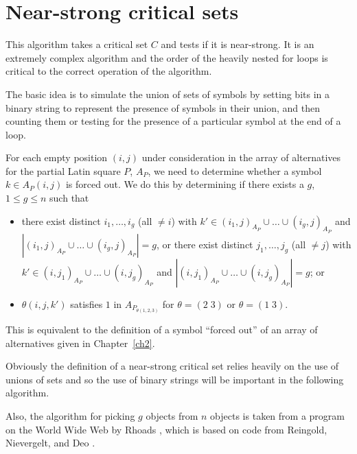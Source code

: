 \documentclass[12pt]{report}
\begin{document}
\section{Near-strong critical sets}
This algorithm takes a critical set $C$ and tests if it is
near-strong.  It is an extremely complex
algorithm and the order of the heavily nested for loops is critical to
the correct operation of the algorithm. 

The basic idea is to simulate the union of sets of symbols by setting bits in
a binary string to represent the presence of symbols in their union, and then
counting them or testing for the presence of a particular symbol at the
end of a loop.  

For each empty position $(i,j)$ under consideration in
the array of alternatives for the partial Latin square $P$, $A_P$, 
we need to determine whether a symbol
$k \in A_P(i,j)$ is forced out.  We do this by determining if there exists a $g$, $1
\leq g \leq n$ such that 
\begin{itemize}
\item [(1)] there exist distinct $i_1, \dots, i_g$ (all $\neq i$) with $k' \in
(i_1,j)_{A_P} \cup \dots \cup (i_g,j)_{A_P}$ and $|(i_1,j)_{A_P} \cup
\dots \cup (i_g,j)_{A_P}| = g$, or there exist distinct $j_1, \dots,
j_g$ (all $\neq j$) with $k' \in (i,j_1)_{A_P} \cup \dots \cup
(i,j_g)_{A_P}$ and $|(i,j_1)_{A_P} \cup \dots \cup (i,j_g)_{A_P}| = g$; or
\item [(2)] $\theta(i,j,k')$ satisfies $1$ in $A_{P_{\theta(1,2,3)}}$ for
$\theta = (2\;3)$ or $\theta = (1\;3)$.
\end{itemize}
This is equivalent to the definition of a symbol ``forced out'' 
of an array of alternatives given in Chapter~\ref{ch2}.

Obviously the definition of a near-strong critical set relies heavily
on the use of unions of sets and so the use of binary strings will be
important in the following algorithm.

Also, the algorithm for picking $g$ objects from $n$ objects is taken
from a program on the World Wide Web by Rhoads \cite{prog}, which is
based on code from Reingold, Nievergelt, and Deo \cite{MR57:11164}.
\end{document}
